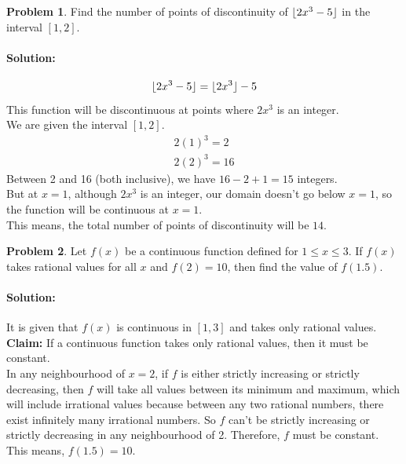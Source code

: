 \documentclass[14]{article}
\DeclarePairedDelimiter\floor{\lfloor}{\rfloor}
\theoremstyle{definition}
\newtheorem{prob}{Problem}
\begin{document}
\begin{prob}
Find the number of points of discontinuity of $\floor{2x^3 - 5}$ in the interval $[1, 2]$.
\paragraph{Solution:}
\[
\floor{2x^3 - 5} = \floor{2x^3} - 5
\]
This function will be discontinuous at points where $2x^3$ is an integer.\\
We are given the interval $[1, 2]$.
\begin{align*}
2(1)^3 = 2\\
2(2)^3 = 16
\end{align*}
Between 2 and 16 (both inclusive), we have $16 - 2 + 1 = 15$ integers.\\
But at $x = 1$, although $2x^3$ is an integer, our domain doesn't go below $x = 1$, so the function will be continuous at $x = 1$.\\
This means, the total number of points of discontinuity will be $14$.
\end{prob}
\begin{prob}
Let $f(x)$ be a continuous function defined for $1 \leq x \leq 3$. If $f(x)$ takes rational values for all $x$ and $f(2) = 10$, then find the value of $f(1.5)$.
\paragraph{Solution:} It is given that $f(x)$ is continuous in $[1, 3]$ and takes only rational values.\\
\textbf{Claim: } If a continuous function takes only rational values, then it must be constant.\\
In any neighbourhood of $x = 2$, if $f$ is either strictly increasing or strictly decreasing, then $f$ will take all values between its minimum and maximum, which will include irrational values because between any two rational numbers, there exist infinitely many irrational numbers. So $f$ can't be strictly increasing or strictly decreasing in any neighbourhood of 2. Therefore, $f$ must be constant.\\
This means, $f(1.5) = 10$.
\end{prob}
\pagebreak
\end{document}
